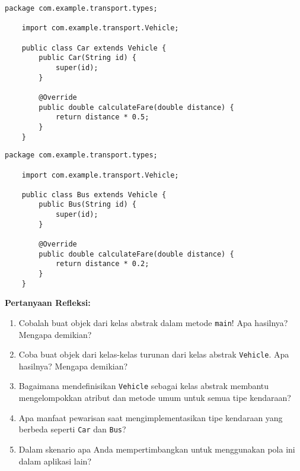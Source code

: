 \begin{lstlisting}[style=JavaStyle, caption={Car.java}]
	package com.example.transport.types;
	
	import com.example.transport.Vehicle;
	
	public class Car extends Vehicle {
		public Car(String id) {
			super(id);
		}
		
		@Override
		public double calculateFare(double distance) {
			return distance * 0.5;
		}
	}
\end{lstlisting}

\begin{lstlisting}[style=JavaStyle, caption={Bus.java}]
	package com.example.transport.types;
	
	import com.example.transport.Vehicle;
	
	public class Bus extends Vehicle {
		public Bus(String id) {
			super(id);
		}
		
		@Override
		public double calculateFare(double distance) {
			return distance * 0.2;
		}
	}
\end{lstlisting}

\textbf{Pertanyaan Refleksi:}
\begin{enumerate}
	\item Cobalah buat objek dari kelas abstrak dalam metode \texttt{main}! Apa hasilnya? Mengapa demikian?
	\begin{tcolorbox}[colback=white, colframe=black,  width=\linewidth, height=3cm, boxrule=1pt, sharp corners]
	\end{tcolorbox}
	\item Coba buat objek dari kelas-kelas turunan dari kelas abstrak \texttt{Vehicle}. Apa hasilnya? Mengapa demikian?
	\begin{tcolorbox}[colback=white, colframe=black,  width=\linewidth, height=3cm, boxrule=1pt, sharp corners]
	\end{tcolorbox}
	\item Bagaimana mendefinisikan \texttt{Vehicle} sebagai kelas abstrak membantu mengelompokkan atribut dan metode umum untuk semua tipe kendaraan?
	\begin{tcolorbox}[colback=white, colframe=black, width=\linewidth, height=3cm, boxrule=1pt, sharp corners]
	\end{tcolorbox}
	\item Apa manfaat pewarisan saat mengimplementasikan tipe kendaraan yang berbeda seperti \texttt{Car} dan \texttt{Bus}?
	\begin{tcolorbox}[colback=white, colframe=black, width=\linewidth, height=3cm, boxrule=1pt, sharp corners]
	\end{tcolorbox}
	\item Dalam skenario apa Anda mempertimbangkan untuk menggunakan pola ini dalam aplikasi lain?
	\begin{tcolorbox}[colback=white, colframe=black, width=\linewidth, height=3cm, boxrule=1pt, sharp corners]
	\end{tcolorbox}
\end{enumerate}

